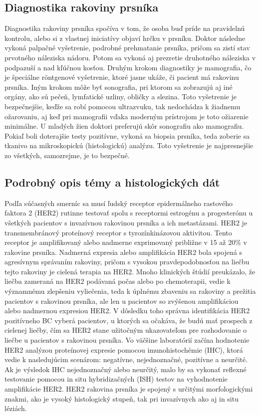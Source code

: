 \subsection{Diagnostika rakoviny prsníka}
\hspace{10mm}Diagnostika rakoviny prsníka spočíva v tom, že osoba buď príde na pravidelnú kontrolu, alebo si z vlastnej iniciatívy objaví hrčku v prsníku. Doktor následne vykoná palpačné vyšetrenie, podrobné prehmatanie prsníka, pričom sa zistí stav prvotného náleziska nádoru. Potom sa vykoná aj prezretie druhotného náleziska v podpazuší a nad kľúčnou kosťou. Druhým  krokom  diagnostiky je mamografia, čo je špeciálne röntgenové vyšetrenie, ktoré jasne ukáže, či pacient má rakovinu prsníka. Iným  krokom môže byť sonografia, pri ktorom sa zobrazujú aj iné orgány, ako sú pečeň, lymfatické uzliny, obličky a slezina. Toto vyšetrenie je bezpečnejšie, keďže sa robí pomocou ultrazvuku, tak nedochádza k žiadnemu ožarovaniu, aj keď pri mamografii vďaka moderným prístrojom je toto ožiarenie minimálne. U mladých žien doktori preferujú skôr sonografiu ako mamografiu. Pokiaľ boli doterajšie testy pozitívne, vykoná sa biopsia prsníka, teda zoberie sa tkanivo na mikroskopickú (histologickú) analýzu. Toto vyšetrenie je najpresnejšie zo všetkých, samozrejme, je to bezpečné. \cite{RAKOVINA-PRSNIKA}

\subsection{Podrobný opis témy a histologických dát} \label{HE2protein}
\hspace{10mm}Podľa súčasných smerníc sa musí ľudský receptor epidermálneho rastového faktora 2 (HER2) rutinne testovať spolu s receptormi estrogénu a progesterónu u všetkých pacientov s invazívnou rakovinou prsníka a ich metastázami. HER2 je transmembránový proteínový receptor s tyrozínkinázovou aktivitou. Tento receptor je amplifikovaný alebo nadmerne exprimovaný približne v 15 až 20\% v rakovine prsníka. Nadmerná expresia alebo amplifikácia HER2 bola spojená s agresívnym správaním rakoviny, pričom s vysokou pravdepodobnosťou na liečbu tejto rakoviny je cielená terapia na HER2. Mnoho klinických štúdií preukázalo, že liečba zameraná na HER2 podávaná počas alebo po chemoterapii, vedie k významnému zlepšeniu vyliečenia, teda k úplnému zbaveniu sa rakoviny a prežitia pacientov s rakovinou prsníka, ale len u pacientov so zvýšenou amplifikáciou alebo nadmernou expresiou HER2. V dôsledku toho správna identifikácia HER2 pozitívneho BC vyberá pacientov, u ktorých sa očakáva, že budú mať prospech z cielenej liečby, čím sa HER2 stane užitočným ukazovateľom pre rozhodovanie o liečbe u pacientov s rakovinou prsníka. Vo väčšine laboratórií začína hodnotenie HER2 analýzou proteínovej expresie pomocou imunohistochémie (IHC), ktorá vedie k nasledujúcim scenárom: negatívne, nejednoznačné, pozitívne a neurčité. Ak je výsledok IHC nejednoznačný alebo neurčitý, malo by sa vykonať reflexné testovanie pomocou in situ hybridizačných (ISH) testov na vyhodnotenie amplifikácie HER2. HER2 rakovina prsníka  je spojený s určitými morfologickými znakmi, ako je vysoký histologický stupeň, tak pri invazívnych  ako aj in situ léziách.
 \cite{ECDP2020}
